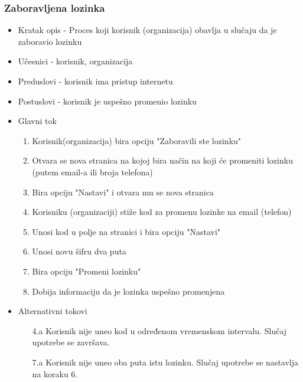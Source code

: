 \subsubsection{Zaboravljena lozinka}
\begin{itemize}
    \item Kratak opis - Proces koji korisnik (organizacija) obavlja u slučaju da je zaboravio lozinku
    \item Učesnici - korisnik, organizacija
    \item Preduslovi - korisnik ima pristup internetu
    \item Postuslovi - korisnik je uspešno promenio lozinku
    \item Glavni tok
        \begin{enumerate}
	        \item Korisnik(organizacija) bira opciju "Zaboravili ste lozinku"
	        \item Otvara se nova stranica na kojoj bira način na koji će promeniti lozinku (putem email-a ili broja telefona)
	        \item Bira opciju "Nastavi" i otvara mu se nova stranica
	        \item Korisniku (organizaciji) stiže kod za promenu lozinke na email (telefon)
	        \item Unosi kod u polje na stranici i bira opciju "Nastavi"
	        \item Unosi novu šifru dva puta
	        \item Bira opciju "Promeni lozinku"
	        \item Dobija informaciju da je lozinka uspešno promenjena
        \end{enumerate}
    \item Alternativni tokovi
        \begin{itemize}
            \item[4.a] Korisnik nije uneo kod u određenom vremenskom intervalu. Slučaj upotrebe se završava.
            \item[7.a] Korisnik nije uneo oba puta istu lozinku. Slučaj upotrebe se nastavlja na koraku 6.
            
        \end{itemize}
\end{itemize}

